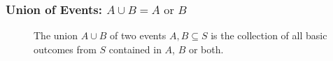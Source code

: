 \begin{frame}
\frametitle{Union of Events: $A\cup B = A \mbox{ or } B$}
\begin{figure}
\centering
{}
\caption{The union $A\cup B$ of two events $A,B\subseteq S$ is the collection of all basic outcomes from $S$ contained in $A$, $B$ or both.}
\end{figure}
\end{frame}


